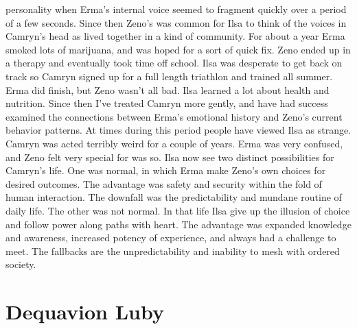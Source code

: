 \documentclass[12pt]{book}
\begin{document}
personality when Erma's internal voice seemed to fragment quickly over a period of a few seconds. Since then Zeno's was common for Ilsa to think of the voices in Camryn's head as lived together in a kind of community. For about a year Erma smoked lots of marijuana, and was hoped for a sort of quick fix. Zeno ended up in a therapy and eventually took time off school. Ilsa was desperate to get back on track so Camryn signed up for a full length triathlon and trained all summer. Erma did finish, but Zeno wasn't all bad. Ilsa learned a lot about health and nutrition. Since then I've treated Camryn more gently, and have had success examined the connections between Erma's emotional history and Zeno's current behavior patterns. At times during this period people have viewed Ilsa as strange. Camryn was acted terribly weird for a couple of years. Erma was very confused, and Zeno felt very special for was so. Ilsa now see two distinct possibilities for Camryn's life. One was normal, in which Erma make Zeno's own choices for desired outcomes. The advantage was safety and security within the fold of human interaction. The downfall was the predictability and mundane routine of daily life. The other was not normal. In that life Ilsa give up the illusion of choice and follow power along paths with heart. The advantage was expanded knowledge and awareness, increased potency of experience, and always had a challenge to meet. The fallbacks are the unpredictability and inability to mesh with ordered society.



\chapter{Dequavion Luby}
\end{document}
